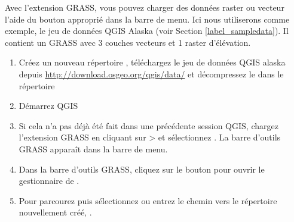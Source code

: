 
Avec l'extension GRASS, vous pouvez charger des données raster ou vecteur l'aide du bouton approprié dans la barre de menu. Ici nous utiliserons comme exemple, le jeu de données QGIS Alaska (voir Section \ref{label_sampledata}). Il contient un  GRASS avec 3 couches vecteurs et 1 raster d'élévation.

\begin{enumerate}
  \item Créez un nouveau répertoire , téléchargez le jeu de données QGIS alaska  depuis  \url{http://download.osgeo.org/qgis/data/} et décompressez le dans le répertoire 
  \item Démarrez QGIS
  \item Si cela n'a pas déjà été fait dans une précédente session QGIS, chargez l'extension GRASS en cliquant sur  >  et sélectionnez . La barre d'outils GRASS apparaît dans la barre de menu.
  \item Dans la barre d'outils GRASS, cliquez sur le bouton  pour ouvrir le gestionnaire de .
  \item Pour  parcourez puis sélectionnez ou entrez le chemin vers le répertoire nouvellement créé, .

\end{enumerate}
